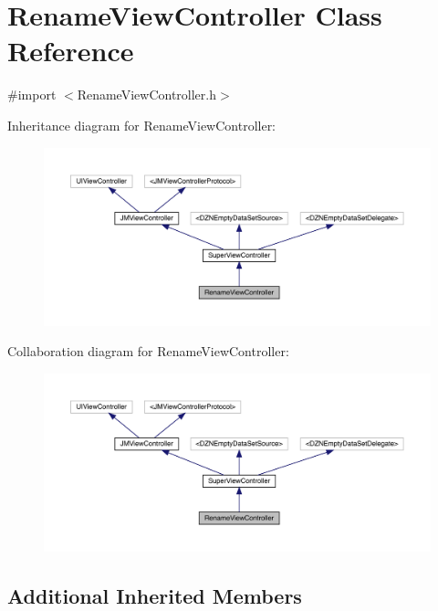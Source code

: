 \hypertarget{interface_rename_view_controller}{}\section{Rename\+View\+Controller Class Reference}
\label{interface_rename_view_controller}


{\ttfamily \#import $<$Rename\+View\+Controller.\+h$>$}



Inheritance diagram for Rename\+View\+Controller\+:\nopagebreak
\begin{figure}[H]
\begin{center}
\leavevmode
\includegraphics[width=350pt]{interface_rename_view_controller__inherit__graph}
\end{center}
\end{figure}


Collaboration diagram for Rename\+View\+Controller\+:\nopagebreak
\begin{figure}[H]
\begin{center}
\leavevmode
\includegraphics[width=350pt]{interface_rename_view_controller__coll__graph}
\end{center}
\end{figure}
\subsection*{Additional Inherited Members}


